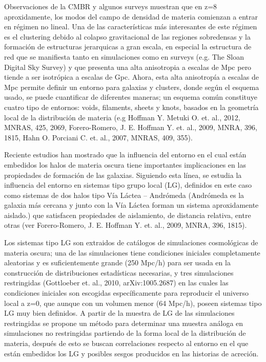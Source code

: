 




\begin{abstracts}        %

Observaciones de la CMBR y algunos surveys muestran que en z=8 aproxidamente,
los modos del campo de densidad de materia comienzan a entrar en régimen no lineal.
Una de las características más interesantes de este régimen es el clustering debido 
al colapso gravitacional de las regiones sobredensas y la formación de estructuras 
jerarquicas a gran escala, en especial la estructura de red que se manifiesta tanto 
en simulaciones como en surveys (e.g. The Sloan Digital Sky Survey) y que presenta 
una alta anisotropia a escalas de Mpc pero tiende a ser isotrópica a escalas de Gpc.
Ahora, esta alta anisotropía a escalas de Mpc permite definir un entorno para 
galaxias y clusters, donde según el esquema usado, se puede cuantificar de diferentes 
maneras; un esquema común constituye cuatro tipo de entornos: voids, filaments, sheets 
y knots, basados en la geometría local de la distribución de materia (e.g Hoffman Y. 
Metuki O. et. al., 2012, MNRAS, 425, 2069,  Forero-Romero, J. E. Hoffman Y. et. al., 
2009,  MNRA, 396, 1815,  Hahn O. Porciani C. et. al., 2007, MNRAS, 409, 355).

 
Reciente estudios han mostrado que la influencia del entorno en el cual están 
embedidos los halos de materia oscura tiene importantes implicaciones en las 
propiedades de formación de las galaxias. Siguiendo esta línea, se estudia la 
influencia del entorno en sistemas tipo grupo local (LG), definidos en este caso como
sistemas de dos halos tipo Vía Láctea – Andrómeda (Andrómeda es la galaxia más cercana
y junto con la Vía Láctea forman un sistema aproxidamente aislado.) que satisfacen 
propiedades de aislamiento, de distancia relativa, entre otras (ver Forero-Romero, 
J. E. Hoffman Y. et. al., 2009,  MNRA, 396, 1815).


Los sistemas tipo LG son extraidos de catálogos de simulaciones cosmológicas de 
materia oscura; una de las simulaciones tiene condiciones iniciales completamente 
aleatorias y es suficientemente grande (250 Mpc/h) para ser usada en la construcción 
de distribuciones estadísticas necesarias, y tres simulaciones restringidas 
(Gottloeber et. al., 2010, arXiv:1005.2687) en las cuales las condiciones iniciales 
son escogidas específicamente para reproducir el universo local a z=0, que aunque con
un volumen menor (64 Mpc/h), poseen sistemas tipo LG muy bien definidos. A partir de 
la muestra de LG de las simulaciones restringidas se propone un método para determinar 
una muestra análoga en simulaciones no restringidas partiendo de la forma local de 
la distribución de materia, después de esto se buscan correlaciones respecto al 
entorno en el que están embedidos los LG y posibles sesgos producidos en las historias 
de acreción.



\end{abstracts}
